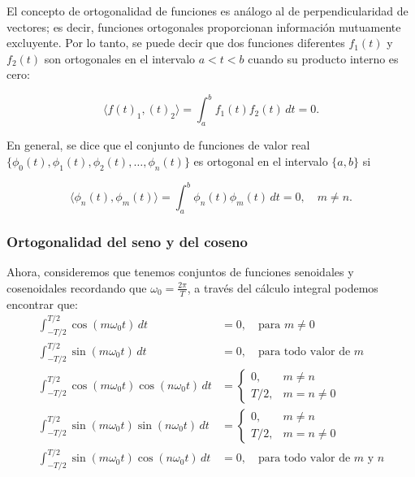 El concepto de ortogonalidad de funciones es análogo al de perpendicularidad de vectores; es decir, funciones ortogonales proporcionan información mutuamente excluyente. Por lo tanto, se puede decir que dos funciones diferentes \(f_1(t)\) y \(f_2(t)\) son ortogonales en el intervalo \(a < t < b\) cuando su producto interno es cero:

\begin{equation}\label{eq:ortogonalidad}
	\langle f(t)_1, (t)_2 \rangle = \int_a^b f_1(t) f_2(t) \, dt = 0.
\end{equation}

En general, se dice que el conjunto de funciones de valor real $\{ \phi_0(t), \phi_1(t), \phi_2(t), \dots, \phi_n(t) \}$ es ortogonal en el intervalo $\{ a,b\}$ si \cite{matesAvanzadasZill}

\begin{equation}\label{eq:ortogonalidad_formula}
	\langle \phi_n(t), \phi_m(t) \rangle = \int_a^b \phi_n(t) \phi_m(t) \, dt = 0 , \quad m \neq n.
\end{equation}

\subsubsection{Ortogonalidad del seno y del coseno}

Ahora, consideremos que tenemos conjuntos de funciones senoidales y cosenoidales recordando que $\omega_0 = \frac{2\pi}{T}$, a través del cálculo integral podemos encontrar que:
\begin{align}
	\int_{-T/2}^{T/2} \cos(m \omega_0 t) \, dt &= 0, \quad \text{para } m \neq 0 \\
	\int_{-T/2}^{T/2} \sin(m \omega_0 t) \, dt &= 0, \quad \text{para todo valor de } m \\
	\int_{-T/2}^{T/2} \cos(m \omega_0 t) \cos(n \omega_0 t) \, dt &= 
	\begin{cases}
		0, & m \neq n \\
		T/2, & m = n \neq 0
	\end{cases} \\
	\int_{-T/2}^{T/2} \sin(m \omega_0 t) \sin(n \omega_0 t) \, dt &= 
	\begin{cases}
		0, & m \neq n \\
		T/2, & m = n \neq 0
	\end{cases} \\
	\int_{-T/2}^{T/2} \sin(m \omega_0 t) \cos(n \omega_0 t) \, dt &= 0, \quad \text{para todo valor de } m \text{ y } n
\end{align}

